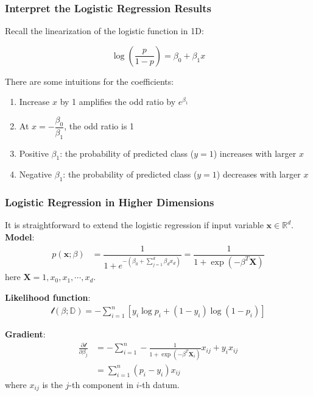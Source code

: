 \documentclass[10pt,aspectratio=169]{beamer}
\begin{document}
      \begin{frame}
        \frametitle{Interpret the Logistic Regression Results}
        Recall the linearization of the logistic function in 1D:

        \begin{equation*}
          \log \left(\frac{p}{1 - p}\right) = \beta_{0} + \beta_{1}x
        \end{equation*}

        There are some intuitions for the coefficients:
        \begin{enumerate}
          \vfill \item Increase $x$ by 1 amplifies the odd ratio by
          $e^{\beta_{1}}$ \vfill \item At
          $x = - \dfrac{\beta_{0}}{\beta_{1}}$, the odd ratio is 1
          \vfill \item Positive $\beta_{1}$: the probability of
          predicted class ($y=1$) increases with larger $x$
          \vfill \item Negative $\beta_{1}$: the probability of
          predicted class ($y=1$) decreases with larger $x$
        \end{enumerate}
      \end{frame}

      \begin{frame}
        \frametitle{Logistic Regression in Higher Dimensions}

        It is straightforward to extend the logistic regression if
        input variable $\mathbf{x} \in \mathbb{R}^{d}$.  \vfill
        \textbf{Model}:
        \begin{align*}
          p(\mathbf{x}; \beta) &= \dfrac{1}{1 + e^{-(\beta_{0} + \sum_{j=1}^{d} \beta_{d} x_{d})}} = \dfrac{1}{1 + \exp(- \beta^{T} \mathbf{X})}
        \end{align*}
        here $\mathbf{X} = {1, x_{0}, x_{1}, \cdots, x_{d}}$.

        \vfill \textbf{Likelihood function}:
        \begin{align*}
          \mathscr{l}(\beta; \mathbb{D}) = -\sum_{i=1}^{n}\left[y_{i} \log p_{i} + (1 - y_{i})\log (1 - p_{i}) \right] 
        \end{align*}

        \vfill \textbf{Gradient}:
        \begin{align*}
          \frac{\partial \mathscr{l}}{\partial \beta_{j}}
          &= -\sum_{i=1}^{n} -\frac{1}{1 + \exp(-\beta^{T} \mathbf{X}_{i})} x_{ij} + y_{i}x_{ij} \\
          &= \sum_{i=1}^{n} (p_{i} - y_{i})x_{ij}
        \end{align*}
        where $x_{ij}$ is the $j$-th component in $i$-th datum.
        
      \end{frame}
\end{document}
